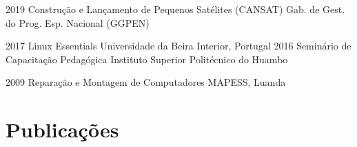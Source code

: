 \begin{entrada}




\cursos
{2019}
{Construção e Lançamento de Pequenos Satélites (CANSAT)}
{Gab. de Gest. do Prog. Esp. Nacional (GGPEN)}
{\vspace{-0.3cm}}

\cursos
{2017}
{Linux Essentials}
{Universidade da Beira Interior, Portugal}
{\vspace{-0.3cm}}
\cursos
{2016}
{Seminário de Capacitação Pedagógica}
{Instituto Superior Politécnico do Huambo}
{\vspace{-0.3cm}}

\cursos
{2009}
{Reparação e Montagem de Computadores}
{MAPESS, Luanda}
{\vspace{-0.3cm}}
\end{entrada}

\section{Publicações}

  

